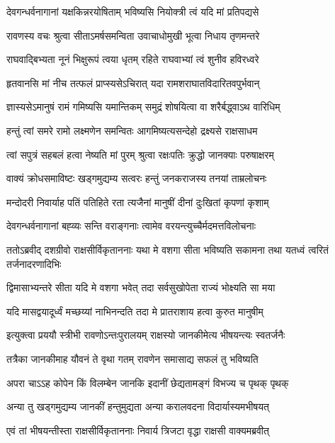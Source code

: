 \twolineshloka
{देवगन्धर्वनागानां यक्षकिन्नरयोषिताम्}
{भविष्यसि नियोक्त्री त्वं यदि मां प्रतिपद्यसे} %

\twolineshloka
{रावणस्य वचः श्रुत्वा सीताऽमर्षसमन्विता}
{उवाचाधोमुखी भूत्वा निधाय तृणमन्तरे} %

\twolineshloka
{राघवाद्बिभ्यता नूनं भिक्षुरूपं त्वया धृतम्}
{रहिते राघवाभ्यां त्वं शुनीव हविरध्वरे} %

\twolineshloka
{हृतवानसि मां नीच तत्फलं प्राप्स्यसेऽचिरात्}
{यदा रामशराघातविदारितवपुर्भवान्} %

\twolineshloka
{ज्ञास्यसेऽमानुषं रामं गमिष्यसि यमान्तिकम्}
{समुद्रं शोषयित्वा वा शरैर्बद्\mbox{}ध्वाऽथ वारिधिम्} %

\twolineshloka
{हन्तुं त्वां समरे रामो लक्ष्मणेन समन्वितः}
{आगमिष्यत्यसन्देहो द्रक्ष्यसे राक्षसाधम} %

\twolineshloka
{त्वां सपुत्रं सहबलं हत्वा नेष्यति मां पुरम्}
{श्रुत्वा रक्षःपतिः क्रुद्धो जानक्याः परुषाक्षरम्} %

\twolineshloka
{वाक्यं क्रोधसमाविष्टः खड्गमुद्यम्य सत्वरः}
{हन्तुं जनकराजस्य तनयां ताम्रलोचनः} %

\twolineshloka
{मन्दोदरी निवार्याह पतिं पतिहिते रता}
{त्यजैनां मानुषीं दीनां दुःखितां कृपणां कृशाम्} %

\twolineshloka
{देवगन्धर्वनागानां बह्व्यः सन्ति वराङ्गनाः}
{त्वामेव वरयन्त्युच्चैर्मदमत्तविलोचनाः} %

\threelineshloka
{ततोऽब्रवीद् दशग्रीवो राक्षसीर्विकृताननाः}
{यथा मे वशगा सीता भविष्यति सकामना}
{तथा यतध्वं त्वरितं तर्जनादरणादिभिः} %

\twolineshloka
{द्विमासाभ्यन्तरे सीता यदि मे वशगा भवेत्}
{तदा सर्वसुखोपेता राज्यं भोक्ष्यति सा मया} %

\twolineshloka
{यदि मासद्वयादूर्ध्वं मच्छय्यां नाभिनन्दति}
{तदा मे प्रातराशाय हत्वा कुरुत मानुषीम्} %

\twolineshloka
{इत्युक्त्वा प्रययौ स्त्रीभी रावणोऽन्तःपुरालयम्}
{राक्षस्यो जानकीमेत्य भीषयन्त्यः स्वतर्जनैः} %

\twolineshloka
{तत्रैका जानकीमाह यौवनं ते वृथा गतम्}
{रावणेन समासाद्य सफलं तु भविष्यति} %

\twolineshloka
{अपरा चाऽऽह कोपेन किं विलम्बेन जानकि}
{इदानीं छेद्यतामङ्गं विभज्य च पृथक् पृथक्} %

\twolineshloka
{अन्या तु खड्गमुद्यम्य जानकीं हन्तुमुद्यता}
{अन्या करालवदना विदार्यास्यमभीषयत्} %

\twolineshloka
{एवं तां भीषयन्तीस्ता राक्षसीर्विकृताननाः}
{निवार्य त्रिजटा वृद्धा राक्षसी वाक्यमब्रवीत्} %

